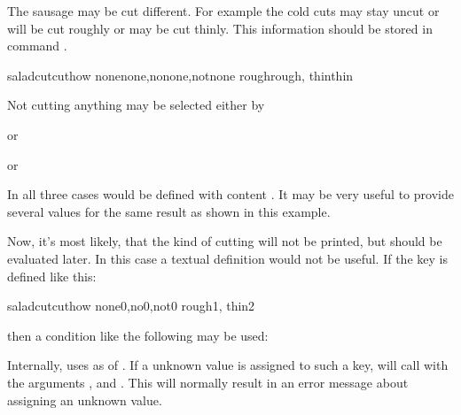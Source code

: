 \begin{Example}
  The sausage may be cut different. For example the cold cuts may stay uncut or
  will be cut roughly or may be cut thinly. This information should be stored
  in command .
\begin{lstcode}
                     {saladcut}{cuthow}{%
                       {none}{none},{no}{none},{not}{none}%
                       {rough}{rough},%
                       {thin}{thin}%
                     }
\end{lstcode}
  Not cutting anything may be selected either by
\begin{lstcode}
\end{lstcode}
  or
\begin{lstcode}
\end{lstcode}
  or
\begin{lstcode}
\end{lstcode}
  In all three cases  would be defined with content
  . It may be very useful to provide several values for the same
  result as shown in this example.

  Now, it's most likely, that the kind of cutting will not be printed, but
  should be evaluated later. In this case a textual definition would not be
  useful. If the key is defined like this:
\begin{lstcode}
                     {saladcut}{cuthow}{%
                       {none}{0},{no}{0},{not}{0}%
                       {rough}{1},%
                       {thin}{2}%
                     }
\end{lstcode}
  then a condition like the following may be used:
\begin{lstcode}
  \ifcase\cuthow
  \or
  \else
  \fi
\end{lstcode}
\end{Example}
Internally,  uses  as
 of . If a unknown value is assigned to
such a key,  will call 
with the arguments ,  and . This will
normally result in an error message about assigning an unknown value.
%
%
%

